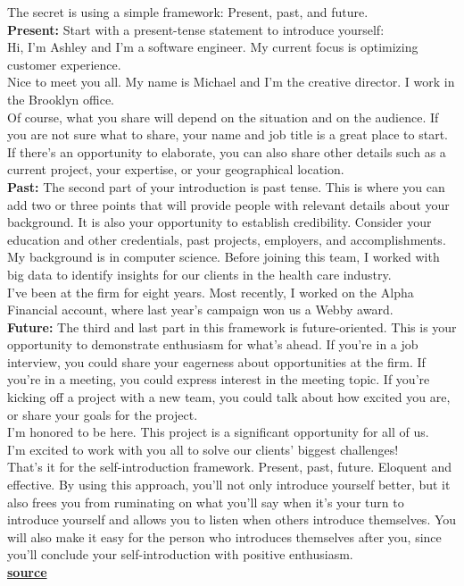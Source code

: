 \documentclass{article}
\begin{document}
\begin{info}
	The secret is using a simple framework: Present, past, and future.\\
	
	\textbf{Present:} Start with a present-tense statement to introduce yourself: \\
	Hi, I'm Ashley and I'm a software engineer. My current focus is optimizing customer experience.\\
	Nice to meet you all. My name is Michael and I'm the creative director. I work in the Brooklyn office.\\
	Of course, what you share will depend on the situation and on the audience. If you are not sure what to share, your name and job title is a great place to start. If there's an opportunity to elaborate, you can also share other details such as a current project, your expertise, or your geographical location. \\ %
	
	\textbf{Past:} The second part of your introduction is past tense. This is where you can add two or three points that will provide people with relevant details about your background. It is also your opportunity to establish credibility. Consider your education and other credentials, past projects, employers, and accomplishments.\\
	My background is in computer science. Before joining this team, I worked with big data to identify insights for our clients in the health care industry.\\
	I’ve been at the firm for eight years. Most recently, I worked on the Alpha Financial account, where last year’s campaign won us a Webby award. \\
	
	\textbf{Future:} The third and last part in this framework is future-oriented. This is your opportunity to demonstrate enthusiasm for what’s ahead. If you’re in a job interview, you could share your eagerness about opportunities at the firm. If you’re in a meeting, you could express interest in the meeting topic. If you’re kicking off a project with a new team, you could talk about how excited you are, or share your goals for the project.\\
	I’m honored to be here. This project is a significant opportunity for all of us. \\
	I’m excited to work with you all to solve our clients’ biggest challenges! \\

	That’s it for the self-introduction framework. Present, past, future. Eloquent and effective. By using this approach, you’ll not only introduce yourself better, but it also frees you from ruminating on what you’ll say when it’s your turn to introduce yourself and allows you to listen when others introduce themselves. You will also make it easy for the person who introduces themselves after you, since you’ll conclude your self-introduction with positive enthusiasm.\\ %
	\href{https://hbr.org/2022/08/a-simple-way-to-introduce-yourself}{\textbf{source}}
\end{info}
\end{document}

